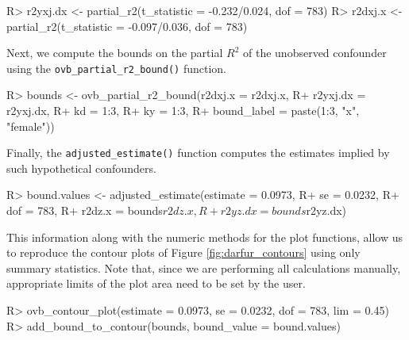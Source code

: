 \documentclass[
]{jss}
\begin{document}
\begin{CodeChunk}

\begin{CodeInput}
R> r2yxj.dx <- partial_r2(t_statistic = -0.232/0.024, dof = 783)
R> r2dxj.x <- partial_r2(t_statistic = -0.097/0.036, dof = 783)
\end{CodeInput}
\end{CodeChunk}

Next, we compute the bounds on the partial \(R^2\) of the unobserved
confounder using the \texttt{ovb\_partial\_r2\_bound()} function.

\begin{CodeChunk}

\begin{CodeInput}
R> bounds <- ovb_partial_r2_bound(r2dxj.x = r2dxj.x,
R+                                r2yxj.dx = r2yxj.dx,
R+                                kd = 1:3,
R+                                ky = 1:3,
R+                                bound_label = paste(1:3, "x", "female"))
\end{CodeInput}
\end{CodeChunk}

Finally, the \texttt{adjusted\_estimate()} function computes the
estimates implied by such hypothetical confounders.

\begin{CodeChunk}

\begin{CodeInput}
R> bound.values <- adjusted_estimate(estimate = 0.0973,
R+                                   se = 0.0232,
R+                                   dof = 783,
R+                                   r2dz.x = bounds$r2dz.x,
R+                                   r2yz.dx = bounds$r2yz.dx)
\end{CodeInput}
\end{CodeChunk}

This information along with the numeric methods for the plot functions,
allow us to reproduce the contour plots of Figure
\ref{fig:darfur_contours} using only summary statistics. Note that,
since we are performing all calculations manually, appropriate limits of
the plot area need to be set by the user.

\begin{CodeChunk}

\begin{CodeInput}
R> ovb_contour_plot(estimate = 0.0973, se = 0.0232, dof = 783, lim = 0.45)
R> add_bound_to_contour(bounds, bound_value = bound.values)
\end{CodeInput}
\end{CodeChunk}
\end{document}
